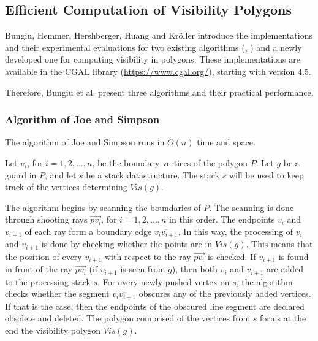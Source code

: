 \subsection{Efficient Computation of Visibility Polygons}
Bungiu, Hemmer, Hershberger, Huang and Kr\"oller  \cite{DBLP:journals/corr/BungiuHHHK14} introduce the implementations and their experimental evaluations for two existing algorithms (\cite{joe1987corrections}, \cite{asano1985efficient}) and a newly developed one for computing visibility in polygons. These implementations are available in the CGAL library (\url{https://www.cgal.org/}), starting with version 4.5.


Therefore, Bungiu et al. present three algorithms and their practical performance.

\subsubsection{Algorithm of Joe and Simpson}
The algorithm of Joe and Simpson \cite{joe1987corrections} runs in $O(n)$ time and space. 

Let $v_i$, for $i = {1, 2, ..., n}$, be the boundary vertices of the polygon $P$. Let $g$ be a guard in $P$, and let $s$ be a stack datastructure. The stack $s$ will be used to keep track of the vertices determining $\mathit{Vis}(g)$. 

The algorithm begins by scanning the boundaries of $P$. The scanning is done through shooting rays $\vec{pv_i}$, for $i = {1, 2, ..., n}$ in this order. The endpoints $v_i$ and $v_{i + 1}$ of each ray form a boundary edge $\overline{v_iv_{i + 1}}$. In this way, the processing of $v_i$ and $v_{i + 1}$ is done by checking whether the points are in $\mathit{Vis}(g)$. This means that the position of every $v_{i + 1}$ with respect to the ray $\vec{pv_i}$ is checked. If $v_{i + 1}$ is found in front of the ray $\vec{pv_i}$ (if $v_{i + 1}$ is seen from $g$), then both $v_i$ and $v_{i + 1}$ are added to the processing stack $s$. For every newly pushed vertex on $s$, the algorithm checks whether the segment $\overline{v_iv_{i + 1}}$ obscures any of the previously added vertices. If that is the case, then the endpoints of the obscured line segment are declared obsolete and deleted. The polygon comprised of the vertices from $s$ forms at the end the visibility polygon $\mathit{Vis}(g)$.

